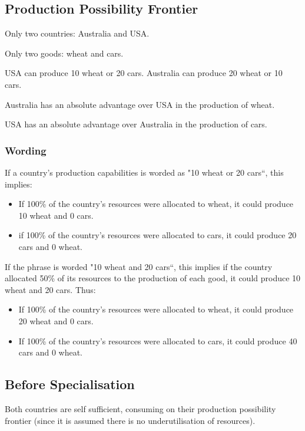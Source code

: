 \documentclass[a4paper,11pt]{article}
\begin{document}
\subsection{Production Possibility Frontier}

Only two countries: Australia and USA.

Only two goods: wheat and cars.

USA can produce 10 wheat or 20 cars. Australia can produce 20 wheat or 10 cars.

Australia has an absolute advantage over USA in the production of wheat.

USA has an absolute advantage over Australia in the production of cars.


\subsubsection{Wording}

If a country's production capabilities is worded as "10 wheat or 20 cars``,
this implies:

\begin{itemize}
\item If 100\% of the country's resources were allocated to wheat, it could
produce 10 wheat and 0 cars.
\item if 100\% of the country's resources were allocated to cars, it could
produce 20 cars and 0 wheat.
\end{itemize}

If the phrase is worded "10 wheat and 20 cars``, this implies if the country
allocated 50\% of its resources to the production of each good, it could produce
10 wheat and 20 cars. Thus:

\begin{itemize}
\item If 100\% of the country's resources were allocated to wheat, it could
produce 20 wheat and 0 cars.
\item If 100\% of the country's resources were allocated to cars, it could
produce 40 cars and 0 wheat.
\end{itemize}


\subsection{Before Specialisation}

Both countries are self sufficient, consuming on their production possibility
frontier (since it is assumed there is no underutilisation of resources).
\end{document}
